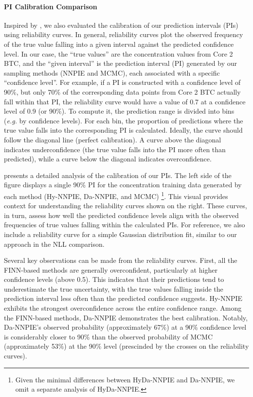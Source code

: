 \paragraph{PI Calibration Comparison}
Inspired by \textcite{finn}, we also evaluated the calibration of our prediction intervals (PIs) using reliability curves. In general, reliability curves plot the observed frequency of the true value falling into a given interval against the predicted confidence level. In our case, the ``true values'' are the concentration values from Core 2 BTC, and the ``given interval'' is the prediction interval (PI) generated by our sampling methods (NNPIE and MCMC), each associated with a specific ``confidence level''. For example, if a PI is constructed with a confidence level of 90\%, but only 70\% of the corresponding data points from Core 2 BTC actually fall within that PI, the reliability curve would have a value of 0.7 at a confidence level of 0.9 (or 90\%).
To compute it, the prediction range is divided into bins (\emph{e.g.} by confidence levels). For each bin, the proportion of predictions where the true value falls into the corresponding PI is calculated. Ideally, the curve should follow the diagonal line (perfect calibration). A curve above the diagonal indicates underconfidence (the true value falls into the PI more often than predicted), while a curve below the diagonal indicates overconfidence.

 presents a detailed analysis of the calibration of our PIs. The left side of the figure displays a single 90\% PI for the concentration training data generated by each method (Hy-NNPIE, Da-NNPIE, and MCMC) \footnote{Given the minimal differences between HyDa-NNPIE and Da-NNPIE, we omit a separate analysis of HyDa-NNPIE.}. This visual provides context for understanding the reliability curves shown on the right. These curves, in turn, assess how well the predicted confidence levels align with the observed frequencies of true values falling within the calculated PIs. For reference, we also include a reliability curve for a simple Gaussian distribution fit, similar to our approach in the NLL comparison.

Several key observations can be made from the reliability curves. First, all the FINN-based methods are generally overconfident, particularly at higher confidence levels (above 0.5). This indicates that their predictions tend to underestimate the true uncertainty, with the true values falling inside the prediction interval less often than the predicted confidence suggests. Hy-NNPIE exhibits the strongest overconfidence across the entire confidence range. Among the FINN-based methods, Da-NNPIE demonstrates the best calibration. Notably, Da-NNPIE's observed probability (approximately 67\%) at a 90\% confidence level is considerably closer to 90\% than the observed probability of MCMC (approximately 53\%) at the 90\% level (prescinded by the crosses on the reliability curves).


